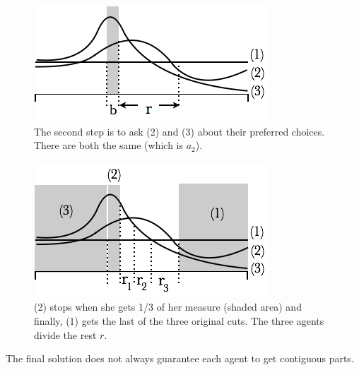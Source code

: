 \begin{figure}[htb]
\begin{center}
        \includegraphics[scale=0.6]{FiguresMaths/cakeprotocolenvyfree2}
        \caption{The second step is to ask (2) and (3) about their preferred choices.
        There are both the same (which is $a_2$).}
        \label{fig:cakeprotocolenvyfree2}
\end{center}
\end{figure}
\begin{figure}[htb]
\begin{center}
        \includegraphics[scale=0.6]{FiguresMaths/cakeprotocolenvyfree3}
        \caption{(2) stops when she gets 1/3 of her measure (shaded area) and finally, (1) gets the last of the three original cuts.
        The three agents divide the rest $r$.}
        \label{fig:cakeprotocolenvyfree3}
\end{center}
\end{figure}

The final solution does not always guarantee each agent to get contiguous parts.

